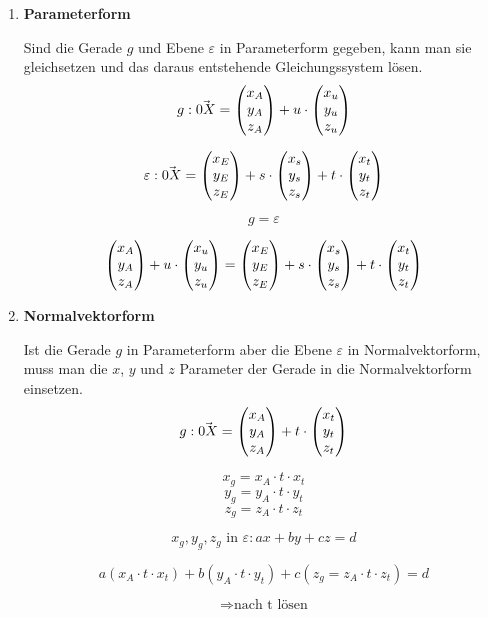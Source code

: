 \begin{enumerate}
  \item{\textbf{Parameterform}}

  Sind die Gerade $g$ und Ebene $\varepsilon$ in Parameterform gegeben, kann man sie gleichsetzen und das daraus entstehende Gleichungssystem l\"{o}sen.
  $$g: \vec{0X} = \begin{pmatrix}x_A \\ y_A \\ z_A\end{pmatrix} + u \cdot \begin{pmatrix}x_u \\ y_u \\ z_u\end{pmatrix}$$ 

  $$\varepsilon: \vec{0X} = \begin{pmatrix}x_E \\ y_E \\ z_E\end{pmatrix} + s \cdot \begin{pmatrix}x_s \\ y_s \\ z_s\end{pmatrix} + t \cdot \begin{pmatrix}x_t \\ y_t \\ z_t\end{pmatrix}$$ 

  $$g = \varepsilon$$ 

  $$\begin{pmatrix}x_A \\ y_A \\ z_A\end{pmatrix} + u \cdot \begin{pmatrix}x_u \\ y_u \\ z_u\end{pmatrix} = \begin{pmatrix}x_E \\ y_E \\ z_E\end{pmatrix} + s \cdot \begin{pmatrix}x_s \\ y_s \\ z_s\end{pmatrix} + t \cdot \begin{pmatrix}x_t \\ y_t \\ z_t\end{pmatrix}$$

  \item{\textbf{Normalvektorform}}

  Ist die Gerade $g$ in Parameterform aber die Ebene $\varepsilon$ in Normalvektorform, muss man die $x$, $y$ und $z$ Parameter der Gerade in die Normalvektorform einsetzen. $$g: \vec{0X} = \begin{pmatrix}x_A \\ y_A \\ z_A\end{pmatrix} + t \cdot \begin{pmatrix}x_t \\ y_t \\ z_t\end{pmatrix}$$

  $$x_g = x_A \cdot t \cdot x_t$$ $$y_g = y_A \cdot t \cdot y_t$$ $$z_g = z_A \cdot t \cdot z_t$$

  $$x_g, y_g, z_g \text{ in } \varepsilon: ax + by + cz = d$$

  $$ a(x_A \cdot t \cdot x_t) + b(y_A \cdot t \cdot y_t) + c(z_g = z_A \cdot t \cdot z_t) = d$$

  $$\Rightarrow \text{nach t l\"{o}sen}$$


\end{enumerate}

